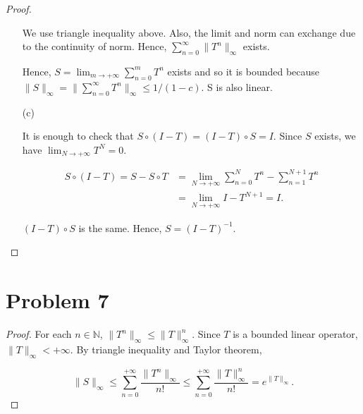 \documentclass[12pt]{article}
\begin{document}
\begin{proof}
\begin{enumerate}
We use triangle inequality above. Also, the limit and norm can exchange due to the continuity of norm. Hence, $\sum_{n=0}^\infty\|T^n\|_\infty$ exists.

Hence, $S = \lim_{m\rightarrow +\infty} \sum_{n=0}^m T^n$ exists and so it is bounded because $\|S\|_\infty = \|\sum_{n=0}^\infty T^n \|_\infty \leqslant 1/(1-c)$. S is also linear.

\item [(c)]

It is enough to check that $S\circ (I-T) = (I-T)\circ S = I$. Since $S$ exists, we have $\lim_{N\rightarrow +\infty} T^{N} = 0$.

$$
\begin{aligned}
S\circ(I-T) = S - S\circ T & = \lim_{N\rightarrow +\infty}\sum_{n=0}^N T^n - \sum_{n=1}^{N+1} T^n \\
& = \lim_{N\rightarrow +\infty} I - T^{N+1} = I.
\end{aligned}
$$


$(I - T)\circ S$ is the same. Hence, $S = (I - T)^{-1}$.

\end{enumerate}
\end{proof}

\section*{Problem 7}

\begin{proof}

For each $n\in\mathbb N$, $\|T^n\|_\infty \leqslant \|T\|^n_\infty$. Since $T$ is a bounded linear operator, $\|T\|_\infty < +\infty$. By triangle inequality and Taylor theorem, 

$$
\|S\|_\infty \leqslant \sum_{n=0}^{+\infty}\frac{\|T^n\|_\infty}{n!} \leqslant \sum_{n=0}^{+\infty}\frac{\|T\|^n_\infty}{n!} = e^{\| T\|_\infty}.
$$

\end{proof}
\end{document}
